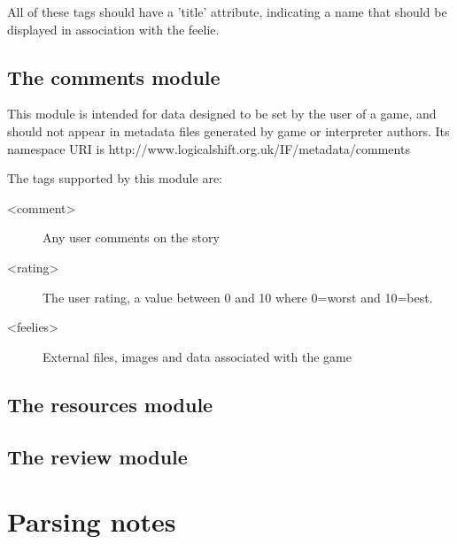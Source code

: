 \documentclass[a4paper,11pt]{article}
\begin{document}
All of these tags should have a 'title' attribute, indicating a name that should be displayed
in association with the feelie.

\subsection{The comments module}

This module is intended for data designed to be set by the user of a game, and should not appear in metadata files generated by
game or interpreter authors. Its namespace URI is http://www.logicalshift.org.uk/IF/metadata/comments

The tags supported by this module are:

\begin{description}
\item[<comment>] Any user comments on the story
\item[<rating>] The user rating, a value between 0 and 10 where 0=worst and 10=best.
\item[<feelies>] External files, images and data associated with the game
\end{description}

\subsection{The resources module}

\subsection{The review module}

\section{Parsing notes}
\end{document}
